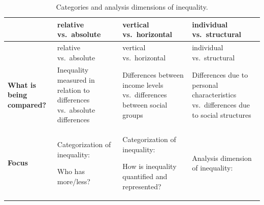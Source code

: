 \documentclass[
  a4paper,
  openany]{book}
\begin{document}
\begin{longtable}[]{@{}
  >{\raggedright\arraybackslash}p{}
  >{\raggedright\arraybackslash}p{}
  >{\raggedright\arraybackslash}p{}
  >{\raggedright\arraybackslash}p{}@{}}
\caption{Categories and analysis dimensions of
inequality.}\label{tbl-FormsInequality}\tabularnewline
\toprule\noalign{}
\begin{minipage}[b]{\linewidth}\raggedright
\end{minipage} & \begin{minipage}[b]{\linewidth}\raggedright
relative vs.~absolute
\end{minipage} & \begin{minipage}[b]{\linewidth}\raggedright
vertical vs.~horizontal
\end{minipage} & \begin{minipage}[b]{\linewidth}\raggedright
individual vs.~structural
\end{minipage} \\
\midrule\noalign{}
\endfirsthead
\toprule\noalign{}
\begin{minipage}[b]{\linewidth}\raggedright
\end{minipage} & \begin{minipage}[b]{\linewidth}\raggedright
relative vs.~absolute
\end{minipage} & \begin{minipage}[b]{\linewidth}\raggedright
vertical vs.~horizontal
\end{minipage} & \begin{minipage}[b]{\linewidth}\raggedright
individual vs.~structural
\end{minipage} \\
\midrule\noalign{}
\endhead
\bottomrule\noalign{}
\endlastfoot
\textbf{What is being compared?} & Inequality measured in relation to
differences vs.~absolute differences & Differences between income levels
vs.~differences between social groups & Differences due to personal
characteristics vs.~differences due to social structures \\
\textbf{Focus} & Categorization of inequality:

Who has more/less? & Categorization of inequality:

How is inequality quantified and represented? & Analysis dimension of
inequality:


\end{longtable}
\end{document}
